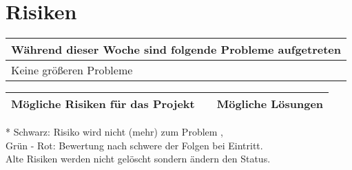 \section*{Risiken}

\begin{tabularx}{\textwidth}{X}
\arrayrulecolor{OliveGreen}
\toprule
{\bfseries Während dieser Woche sind folgende Probleme aufgetreten} 	\\ 
\midrule[2pt]
Keine größeren Probleme											\\
\bottomrule[2pt]
\end{tabularx}

\vspace{1cm}

\begin{threeparttable}
\begin{tabularx}{\textwidth}{XcX}
\arrayrulecolor{OliveGreen}
\toprule
{\bfseries Mögliche Risiken für das Projekt}		& {\bfseries *} 					& {\bfseries Mögliche Lösungen} 	\\ \midrule[2pt]
\bottomrule[2pt]
\end{tabularx}

\begin{tablenotes}\footnotesize
\item[*] Schwarz: Risiko wird nicht (mehr) zum Problem	, 	\\
		Grün - Rot: Bewertung nach schwere der Folgen bei Eintritt.\\
		Alte Risiken werden nicht gelöscht sondern ändern den Status.
\end{tablenotes}
\end{threeparttable}

